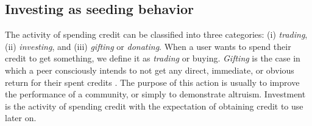 \subsection{Investing as seeding behavior}
The activity of spending credit can be classified into three categories: (i) \textit{trading}, (ii) \textit{investing}, and (iii) \textit{gifting} or \textit{donating}. When a user wants to spend their credit to get something, we define it as \textit{trading} or buying. \textit{Gifting} is the case in which a peer consciously intends to not get any direct, immediate, or obvious return for their spent credits \cite{2006:gifting:ripeanu}. The purpose of this action is usually to improve the performance of a community, or simply to demonstrate altruism. Investment is the activity of spending credit with the expectation of obtaining credit to use later on. 



